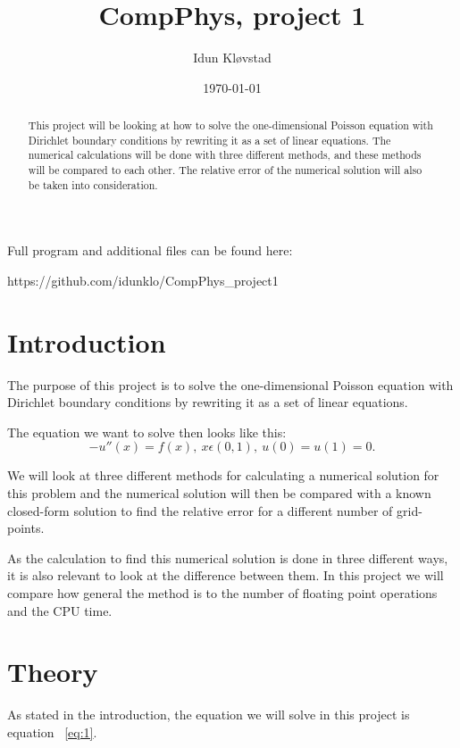 \documentclass[a4paper,norsk,12pt,oneside]{article}
\title{CompPhys, project 1}
\author{Idun Kløvstad}
\date{\today}
\begin{document}
\maketitle
\newpage 

\begin{abstract}
    This project will be looking at how to solve the one-dimensional Poisson equation with
Dirichlet boundary conditions by rewriting it as a set of linear equations. The numerical 
calculations will be done with three different methods, and these methods will be compared 
to each other. The relative error of the numerical solution will also be taken into
consideration. 
\end{abstract}

Full program and additional files can be found here:

https://github.com/idunklo/CompPhys\_project1

\section{Introduction}

The purpose of this project is to solve the one-dimensional Poisson equation with
Dirichlet boundary conditions by rewriting it as a set of linear equations. 

The equation we want to solve then looks like this:
\begin{equation}\label{eq:1}
    -u''(x) = f(x), \ x \epsilon (0,1), \ u(0) = u(1) = 0.
\end{equation}

We will look at three different methods for calculating a numerical solution for this problem and the 
numerical solution will then be compared with a known closed-form solution to find
the relative error for a different number of grid-points.  

As the calculation to find this numerical solution is done
in three different ways, it is also relevant to look at the difference between them.
In this project we will compare how general the method is to the
number of floating point operations and the CPU time.

\section{Theory}

As stated in the introduction, the equation we will solve in this 
project is equation ~\ref{eq:1}. 
\end{document}
